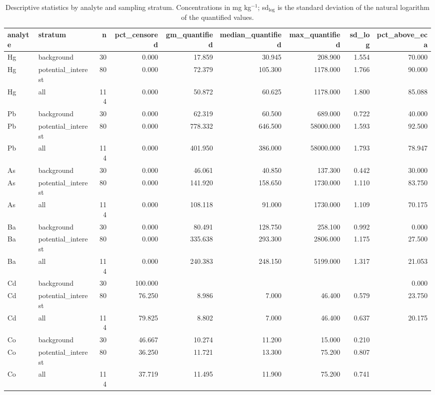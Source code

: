 \begin{table}[htbp]
\centering
\caption{Descriptive statistics by analyte and sampling stratum. Concentrations in mg kg$^{-1}$; sd$_{\log}$ is the standard deviation of the natural logarithm of the quantified values.}
\label{tab:desc}
\footnotesize
\begin{tabular}{llrrrrrrr}
\toprule
analyte & stratum & n & pct\_censored & gm\_quantified & median\_quantified & max\_quantified & sd\_log & pct\_above\_eca \\
\midrule
Hg & background & 30 & 0.000 & 17.859 & 30.945 & 208.900 & 1.554 & 70.000 \\
Hg & potential\_interest & 80 & 0.000 & 72.379 & 105.300 & 1178.000 & 1.766 & 90.000 \\
Hg & all & 114 & 0.000 & 50.872 & 60.625 & 1178.000 & 1.800 & 85.088 \\
Pb & background & 30 & 0.000 & 62.319 & 60.500 & 689.000 & 0.722 & 40.000 \\
Pb & potential\_interest & 80 & 0.000 & 778.332 & 646.500 & 58000.000 & 1.593 & 92.500 \\
Pb & all & 114 & 0.000 & 401.950 & 386.000 & 58000.000 & 1.793 & 78.947 \\
As & background & 30 & 0.000 & 46.061 & 40.850 & 137.300 & 0.442 & 30.000 \\
As & potential\_interest & 80 & 0.000 & 141.920 & 158.650 & 1730.000 & 1.110 & 83.750 \\
As & all & 114 & 0.000 & 108.118 & 91.000 & 1730.000 & 1.109 & 70.175 \\
Ba & background & 30 & 0.000 & 80.491 & 128.750 & 258.100 & 0.992 & 0.000 \\
Ba & potential\_interest & 80 & 0.000 & 335.638 & 293.300 & 2806.000 & 1.175 & 27.500 \\
Ba & all & 114 & 0.000 & 240.383 & 248.150 & 5199.000 & 1.317 & 21.053 \\
Cd & background & 30 & 100.000 &  &  &  &  & 0.000 \\
Cd & potential\_interest & 80 & 76.250 & 8.986 & 7.000 & 46.400 & 0.579 & 23.750 \\
Cd & all & 114 & 79.825 & 8.802 & 7.000 & 46.400 & 0.637 & 20.175 \\
Co & background & 30 & 46.667 & 10.274 & 11.200 & 15.000 & 0.210 &  \\
Co & potential\_interest & 80 & 36.250 & 11.721 & 13.300 & 75.200 & 0.807 &  \\
Co & all & 114 & 37.719 & 11.495 & 11.900 & 75.200 & 0.741 &  \\

\end{tabular}
\end{table}
